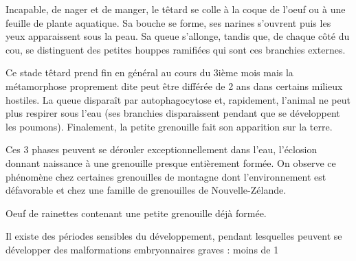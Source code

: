         Incapable, de nager et de manger, le têtard se colle à la coque de l’oeuf ou à une feuille de plante aquatique. Sa bouche se forme, ses narines s’ouvrent puis les yeux apparaissent sous la peau. Sa queue s’allonge, tandis que, de chaque côté du cou, se distinguent des petites houppes ramifiées qui sont ces branchies externes.

        Ce stade têtard prend fin en général au cours du 3ième mois mais la métamorphose proprement dite peut être différée de 2 ans dans certains milieux hostiles. La queue disparaît par autophagocytose et, rapidement, l’animal ne peut plus respirer sous l’eau (ses branchies disparaissent pendant que se développent les poumons). Finalement, la petite grenouille fait son apparition sur la terre.

        Ces 3 phases peuvent se dérouler exceptionnellement dans l’eau, l’éclosion donnant naissance à une grenouille presque entièrement formée. On observe ce phénomène chez certaines grenouilles de montagne dont l’environnement est défavorable et chez une famille de grenouilles de Nouvelle-Zélande.
        	

            Oeuf de rainettes contenant une petite grenouille déjà formée.

        Il existe des périodes sensibles du développement, pendant lesquelles peuvent se développer des malformations embryonnaires graves : moins de 1 %